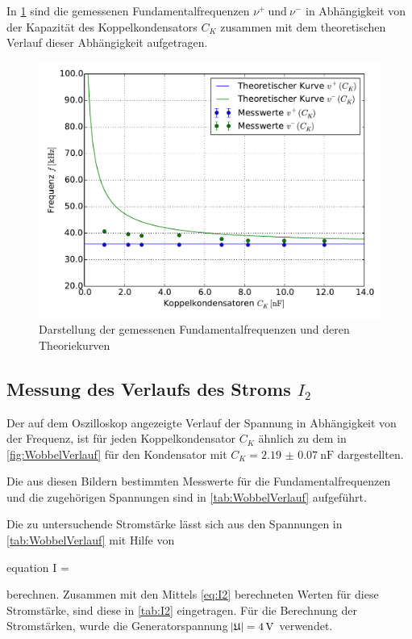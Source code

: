 	
	
	In \cref{fig:Auswertung_FundamentalKurven} sind die gemessenen Fundamentalfrequenzen $\nu^{+}\ \text{und}\ \nu^{-}$ 
	in Abhängigkeit von der Kapazität des Koppelkondensators $C_{K}$ zusammen mit dem theoretischen Verlauf dieser 
	Abhängigkeit aufgetragen.
	
	\begin{figure}[!h]
		\centering
		\includegraphics[scale=0.7]{Grafiken/Frequenz_CK.pdf}
		\caption{Darstellung der gemessenen Fundamentalfrequenzen und deren Theoriekurven}
		\label{fig:Auswertung_FundamentalKurven}
	\end{figure}  
	
	
\subsection{Messung des Verlaufs des Stroms $I_{2}$} \label{sec:Auswertung_Wobbel}
	
	Der auf dem Oszilloskop angezeigte Verlauf der Spannung in Abhängigkeit von der Frequenz, ist für jeden 
	Koppelkondensator $C_{K}$ ähnlich zu dem in \cref{fig:WobbelVerlauf} für den Kondensator mit 
	$C_{K} = \SI{2.19(7)}{\nano\farad}$ dargestellten.
	

	Die aus diesen Bildern bestimmten Messwerte für die Fundamentalfrequenzen und die zugehörigen Spannungen
	sind in \cref{tab:WobbelVerlauf} aufgeführt.  

	
	
	Die zu untersuchende Stromstärke lässt sich aus den Spannungen in \cref{tab:WobbelVerlauf} mit Hilfe von
	\begin{empheq}{equation}
		I =  
	\end{empheq}  
	berechnen. Zusammen mit den Mittels \cref{eq:I2} berechneten Werten für diese Stromstärke, sind diese in
	\cref{tab:I2} eingetragen. Für die Berechnung der Stromstärken, wurde die Generatorspannung $\envert{\mathfrak{U}} = \SI{4}{\volt}$ verwendet. 
	
